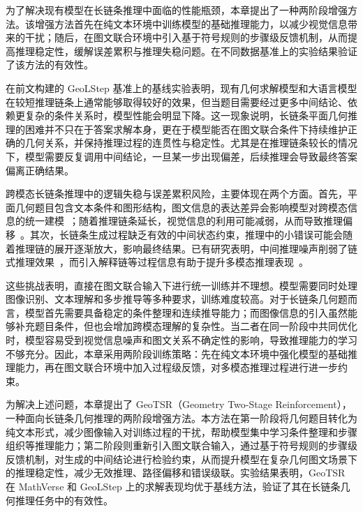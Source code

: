 

为了解决现有模型在长链条推理中面临的性能瓶颈，本章提出了一种两阶段增强方法。该增强方法首先在纯文本环境中训练模型的基础推理能力，以减少视觉信息带来的干扰；随后，在图文联合环境中引入基于符号规则的步骤级反馈机制，从而提高推理稳定性，缓解误差累积与推理失稳问题。在不同数据基准上的实验结果验证了该方法的有效性。


在前文构建的 GeoLStep 基准上的基线实验表明，现有几何求解模型和大语言模型在较短推理链条上通常能够取得较好的效果，但当题目需要经过更多中间结论、依赖更复杂的条件关系时，模型性能会明显下降。这一现象说明，长链条平面几何推理的困难并不只在于答案求解本身，更在于模型能否在图文联合条件下持续维护正确的几何关系，并保持推理过程的连贯性与稳定性。尤其是在推理链条较长的情况下，模型需要反复调用中间结论，一旦某一步出现偏差，后续推理会导致最终答案偏离正确结果。

跨模态长链条推理中的逻辑失稳与误差累积风险，主要体现在两个方面。首先，平面几何题目包含文本条件和图形结构，图文信息的表达差异会影响模型对跨模态信息的统一建模~\cite{laurenccon2024matters}；随着推理链条延长，视觉信息的利用可能减弱，从而导致推理偏移~\cite{sun2025mitigating}。其次，长链条生成过程缺乏有效的中间状态约束，推理中的小错误可能会随着推理链的展开逐渐放大，影响最终结果。已有研究表明，中间推理噪声削弱了链式推理效果~\cite{zhou2024can}，而引入解释链等过程信息有助于提升多模态推理表现~\cite{lu2022learntoexplain}。

这些挑战表明，直接在图文联合输入下进行统一训练并不理想。模型需要同时处理图像识别、文本理解和多步推导等多种要求，训练难度较高。对于长链条几何题而言，模型首先需要具备稳定的条件整理和连续推导能力；而图像信息的引入虽然能够补充题目条件，但也会增加跨模态理解的复杂性。当二者在同一阶段中共同优化时，模型容易受到视觉信息噪声和图文关系不确定性的影响，导致推理能力的学习不够充分。因此，本章采用两阶段训练策略：先在纯文本环境中强化模型的基础推理能力，再在图文联合环境中加入过程级反馈，对多模态推理过程进行进一步约束。

为解决上述问题，本章提出了 GeoTSR（Geometry Two-Stage Reinforcement），一种面向长链条几何推理的两阶段增强方法。本方法在第一阶段将几何题目转化为纯文本形式，减少图像输入对训练过程的干扰，帮助模型集中学习条件整理和步骤组织等推理能力；第二阶段则重新引入图文联合输入，通过基于符号规则的步骤级反馈机制，对生成的中间结论进行检验约束，从而提升模型在复杂几何图文场景下的推理稳定性，减少无效推理、路径偏移和错误级联。实验结果表明，GeoTSR 在 MathVerse 和 GeoLStep 上的求解表现均优于基线方法，验证了其在长链条几何推理任务中的有效性。

